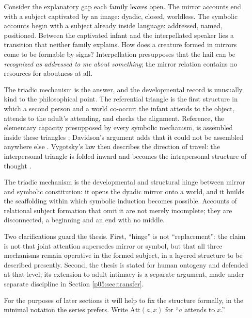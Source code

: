Consider the explanatory gap each family leaves open. The mirror accounts end with a subject captivated by an image: dyadic, closed, worldless. The symbolic accounts begin with a subject already inside language: addressed, named, positioned. Between the captivated infant and the interpellated speaker lies a transition that neither family explains. How does a creature formed in mirrors come to be formable by signs? Interpellation presupposes that the hail can be \emph{recognized as addressed to me about something}; the mirror relation contains no resources for aboutness at all.

The triadic mechanism is the answer, and the developmental record is unusually kind to the philosophical point. The referential triangle is the first structure in which a second person and a world co-occur: the infant attends to the object, attends to the adult's attending, and checks the alignment. Reference, the elementary capacity presupposed by every symbolic mechanism, is assembled inside these triangles \parencite{bruner1983}; Davidson's argument adds that it could not be assembled anywhere else \parencite{davidson2001}. Vygotsky's law then describes the direction of travel: the interpersonal triangle is folded inward and becomes the intrapersonal structure of thought \parencite{vygotsky1978}.

\begin{prop}\label{p05:prop:hinge}
The triadic mechanism is the developmental and structural hinge between mirror and symbolic constitution: it opens the dyadic mirror onto a world, and it builds the scaffolding within which symbolic induction becomes possible. Accounts of relational subject formation that omit it are not merely incomplete; they are disconnected, a beginning and an end with no middle.
\end{prop}

Two clarifications guard the thesis. First, ``hinge'' is not ``replacement'': the claim is not that joint attention supersedes mirror or symbol, but that all three mechanisms remain operative in the formed subject, in a layered structure to be described presently. Second, the thesis is stated for human ontogeny and defended at that level; its extension to adult intimacy is a separate argument, made under separate discipline in Section \ref{p05:sec:transfer}.

For the purposes of later sections it will help to fix the structure formally, in the minimal notation the series prefers. Write $\mathrm{Att}(a,x)$ for ``$a$ attends to $x$.''

